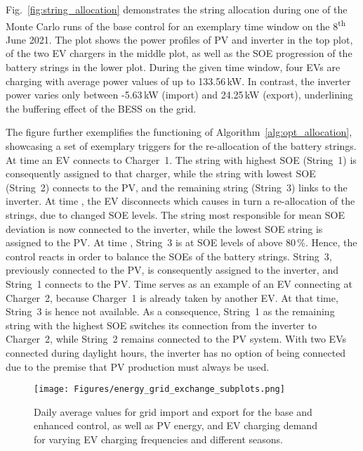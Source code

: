 \documentclass[final,5p,times,twocolumn]{elsarticle}
\begin{document}
Fig.~\ref{fig:string_allocation} demonstrates the string allocation during one of the Monte Carlo runs of the base control for an exemplary time window on the 8\textsuperscript{th} June 2021. The plot shows the power profiles of PV and inverter in the top plot, of the two EV chargers in the middle plot, as well as the SOE progression of the battery strings in the lower plot. During the given time window, four EVs are charging with average power values of up to 133.56\,kW. In contrast, the inverter power varies only between -5.63\,kW (import) and 24.25\,kW (export), underlining the buffering effect of the BESS on the grid. 

The figure further exemplifies the functioning of Algorithm~\ref{alg:opt_allocation}, showcasing a set of exemplary triggers for the re-allocation of the battery strings. At time \raisebox{.5pt}{\textcircled{\raisebox{-.9pt} {1}}} an EV connects to Charger~1. The string with highest SOE (String~1) is consequently assigned to that charger, while the string with lowest SOE (String~2) connects to the PV, and the remaining string (String~3) links to the inverter. At time \raisebox{.5pt}{\textcircled{\raisebox{-.9pt} {2}}}, the EV disconnects which causes in turn a re-allocation of the strings, due to changed SOE levels. The string most responsible for mean SOE deviation is now connected to the inverter, while the lowest SOE string is assigned to the PV. At time \raisebox{.5pt}{\textcircled{\raisebox{-.9pt} {3}}}, String~3 is at SOE levels of above 80\,\%. Hence, the control reacts in order to balance the SOEs of the battery strings. String~3, previously connected to the PV, is consequently assigned to the inverter, and String~1 connects to the PV. Time \raisebox{.5pt}{\textcircled{\raisebox{-.9pt} {4}}} serves as an example of an EV connecting at Charger~2, because Charger~1 is already taken by another EV. At that time, String~3 is hence not available. As a consequence, String~1 as the remaining string with the highest SOE switches its connection from the inverter to Charger~2, while String~2 remains connected to the PV system. With two EVs connected during daylight hours, the inverter has no option of being connected due to the premise that PV production must always be used.

\begin{figure*}[t!]
    \centering
    \texttt{[image: Figures/energy\_grid\_exchange\_subplots.png]}
    \caption{Daily average values for grid import and export for the base and enhanced control, as well as PV energy, and EV charging demand for varying EV charging frequencies and different seasons.}
    \label{fig:energy_grid_exchange}
\end{figure*}
\end{document}
